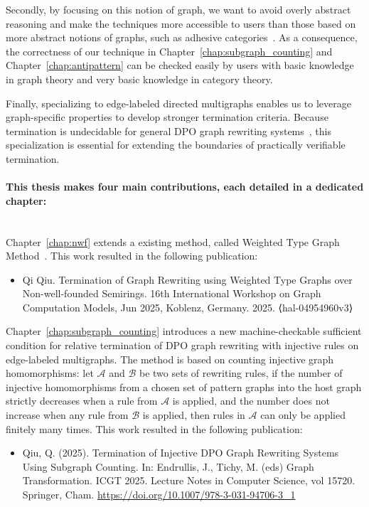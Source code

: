  Secondly, by focusing on this notion of graph, we want to avoid overly abstract reasoning and make the techniques more accessible to users than those based on more abstract notions of graphs, such as adhesive categories~\cite{lack2004adhesive}.
 As a consequence, the correctness of our technique in Chapter~\ref{chap:subgraph_counting} and Chapter~\ref{chap:antipattern} can be checked easily by users with basic knowledge in graph theory and very basic knowledge in category theory.

Finally, specializing to edge-labeled directed multigraphs enables us to leverage graph-specific properties to develop stronger termination criteria. Because termination is undecidable for general DPO graph rewriting systems~\cite{plump1998terminationundecidable}, this specialization is essential for extending the boundaries of practically verifiable termination. 

\paragraph{This thesis makes four main contributions, each detailed in a dedicated chapter:}\ \\
 
Chapter~\ref{chap:nwf} extends a existing method, called Weighted Type Graph Method~\cite{zantema2014termination,bruggink2014termination,bruggink2015proving,endrullis2024generalized_icgt}. This work resulted in the following publication:
\begin{itemize}
\item Qi Qiu. Termination of Graph Rewriting using Weighted Type Graphs over Non-well-founded Semirings. 16th International Workshop on Graph Computation Models, Jun 2025, Koblenz, Germany. 2025. ⟨hal-04954960v3⟩
\end{itemize}
 
 Chapter~\ref{chap:subgraph_counting} introduces a new machine-checkable sufficient condition for relative termination of DPO graph rewriting with injective rules on edge-labeled multigraphs. The method is based on counting injective graph homomorphisms: let $\mathcal{A}$ and $\mathcal{B}$ be two sets of rewriting rules, if the number of injective homomorphisms from a chosen set of pattern graphs into the host graph strictly decreases when a rule from $\mathcal{A}$ is applied, and the number does not increase when any rule from $\mathcal{B}$ is applied, then rules in $\mathcal{A}$ can only be applied finitely many times.
This work resulted in the following publication:
\begin{itemize}
    \item Qiu, Q. (2025). Termination of Injective DPO Graph Rewriting Systems Using Subgraph Counting. In: Endrullis, J., Tichy, M. (eds) Graph Transformation. ICGT 2025. Lecture Notes in Computer Science, vol 15720. Springer, Cham. \url{https://doi.org/10.1007/978-3-031-94706-3_1}
\end{itemize}

